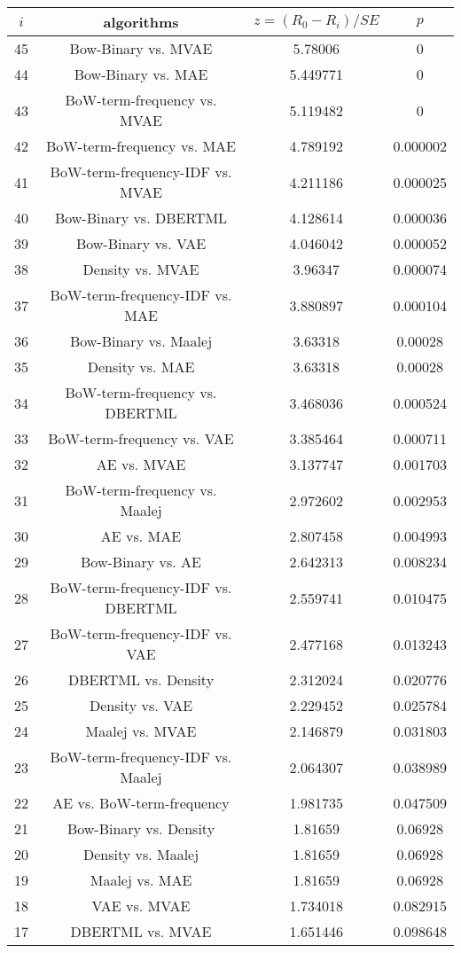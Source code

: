 \documentclass[a4paper,10pt]{article}
\begin{document}
\begin{landscape}
\begin{table}[!htp]
\centering\scriptsize
\begin{tabular}{cccc}
$i$&algorithms&$z=(R_0 - R_i)/SE$&$p$\\
\hline45&Bow-Binary vs. MVAE&5.78006&0\\
44&Bow-Binary vs. MAE&5.449771&0\\
43&BoW-term-frequency vs. MVAE&5.119482&0\\
42&BoW-term-frequency vs. MAE&4.789192&0.000002\\
41&BoW-term-frequency-IDF vs. MVAE&4.211186&0.000025\\
40&Bow-Binary vs. DBERTML&4.128614&0.000036\\
39&Bow-Binary vs. VAE&4.046042&0.000052\\
38&Density vs. MVAE&3.96347&0.000074\\
37&BoW-term-frequency-IDF vs. MAE&3.880897&0.000104\\
36&Bow-Binary vs. Maalej&3.63318&0.00028\\
35&Density vs. MAE&3.63318&0.00028\\
34&BoW-term-frequency vs. DBERTML&3.468036&0.000524\\
33&BoW-term-frequency vs. VAE&3.385464&0.000711\\
32&AE vs. MVAE&3.137747&0.001703\\
31&BoW-term-frequency vs. Maalej&2.972602&0.002953\\
30&AE vs. MAE&2.807458&0.004993\\
29&Bow-Binary vs. AE&2.642313&0.008234\\
28&BoW-term-frequency-IDF vs. DBERTML&2.559741&0.010475\\
27&BoW-term-frequency-IDF vs. VAE&2.477168&0.013243\\
26&DBERTML vs. Density&2.312024&0.020776\\
25&Density vs. VAE&2.229452&0.025784\\
24&Maalej vs. MVAE&2.146879&0.031803\\
23&BoW-term-frequency-IDF vs. Maalej&2.064307&0.038989\\
22&AE vs. BoW-term-frequency&1.981735&0.047509\\
21&Bow-Binary vs. Density&1.81659&0.06928\\
20&Density vs. Maalej&1.81659&0.06928\\
19&Maalej vs. MAE&1.81659&0.06928\\
18&VAE vs. MVAE&1.734018&0.082915\\
17&DBERTML vs. MVAE&1.651446&0.098648\\

\end{tabular}
\end{table}
\end{landscape}
\end{document}
